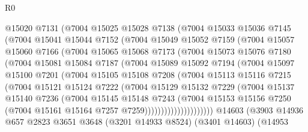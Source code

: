 \begin{lexlean}{R0}
\begin{coremodule}
          @15020
          @7131
          (@7004
            @15025
            @15028
            @7138
            (@7004
              @15033
              @15036
              @7145
              (@7004
                @15041
                @15044
                @7152
                (@7004
                  @15049
                  @15052
                  @7159
                  (@7004
                    @15057
                    @15060
                    @7166
                    (@7004
                      @15065
                      @15068
                      @7173
                      (@7004
                        @15073
                        @15076
                        @7180
                        (@7004
                          @15081
                          @15084
                          @7187
                          (@7004
                            @15089
                            @15092
                            @7194
                            (@7004
                              @15097
                              @15100
                              @7201
                              (@7004
                                @15105
                                @15108
                                @7208
                                (@7004
                                  @15113
                                  @15116
                                  @7215
                                  (@7004
                                    @15121
                                    @15124
                                    @7222
                                    (@7004
                                      @15129
                                      @15132
                                      @7229
                                      (@7004
                                        @15137
                                        @15140
                                        @7236
                                        (@7004
                                          @15145
                                          @15148
                                          @7243
                                          (@7004
                                            @15153
                                            @15156
                                            @7250
                                            (@7004 @15161 @15164 @7257 @7259)))))))))))))))))))))
    @14603
    (@3903
      @14936
      @657
      @2823
      @3651
      @3648
      (@3201 @14933 @8524)
      (@3401 @14603)
      (@14953

\end{coremodule}
\end{lexlean}
